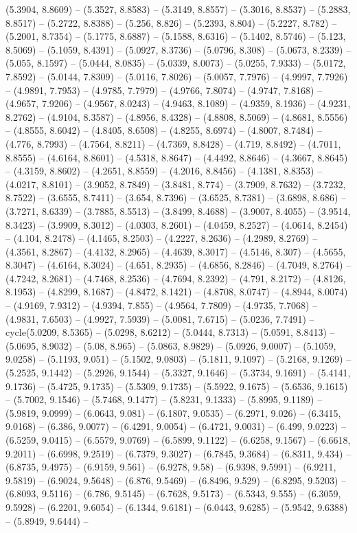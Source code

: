 (5.3904, 8.8609) -- (5.3527, 8.8583) -- (5.3149, 8.8557) -- (5.3016, 8.8537) -- (5.2883, 8.8517) -- (5.2722, 8.8388) -- (5.256, 8.826) -- (5.2393, 8.804) -- (5.2227, 8.782) -- (5.2001, 8.7354) -- (5.1775, 8.6887) -- (5.1588, 8.6316) -- (5.1402, 8.5746) -- (5.123, 8.5069) -- (5.1059, 8.4391) -- (5.0927, 8.3736) -- (5.0796, 8.308) -- (5.0673, 8.2339) -- (5.055, 8.1597) -- (5.0444, 8.0835) -- (5.0339, 8.0073) -- (5.0255, 7.9333) -- (5.0172, 7.8592) -- (5.0144, 7.8309) -- (5.0116, 7.8026) -- (5.0057, 7.7976) -- (4.9997, 7.7926) -- (4.9891, 7.7953) -- (4.9785, 7.7979) -- (4.9766, 7.8074) -- (4.9747, 7.8168) -- (4.9657, 7.9206) -- (4.9567, 8.0243) -- (4.9463, 8.1089) -- (4.9359, 8.1936) -- (4.9231, 8.2762) -- (4.9104, 8.3587) -- (4.8956, 8.4328) -- (4.8808, 8.5069) -- (4.8681, 8.5556) -- (4.8555, 8.6042) -- (4.8405, 8.6508) -- (4.8255, 8.6974) -- (4.8007, 8.7484) -- (4.776, 8.7993) -- (4.7564, 8.8211) -- (4.7369, 8.8428) -- (4.719, 8.8492) -- (4.7011, 8.8555) -- (4.6164, 8.8601) -- (4.5318, 8.8647) -- (4.4492, 8.8646) -- (4.3667, 8.8645) -- (4.3159, 8.8602) -- (4.2651, 8.8559) -- (4.2016, 8.8456) -- (4.1381, 8.8353) -- (4.0217, 8.8101) -- (3.9052, 8.7849) -- (3.8481, 8.774) -- (3.7909, 8.7632) -- (3.7232, 8.7522) -- (3.6555, 8.7411) -- (3.654, 8.7396) -- (3.6525, 8.7381) -- (3.6898, 8.686) -- (3.7271, 8.6339) -- (3.7885, 8.5513) -- (3.8499, 8.4688) -- (3.9007, 8.4055) -- (3.9514, 8.3423) -- (3.9909, 8.3012) -- (4.0303, 8.2601) -- (4.0459, 8.2527) -- (4.0614, 8.2454) -- (4.104, 8.2478) -- (4.1465, 8.2503) -- (4.2227, 8.2636) -- (4.2989, 8.2769) -- (4.3561, 8.2867) -- (4.4132, 8.2965) -- (4.4639, 8.3017) -- (4.5146, 8.307) -- (4.5655, 8.3047) -- (4.6164, 8.3024) -- (4.651, 8.2935) -- (4.6856, 8.2846) -- (4.7049, 8.2764) -- (4.7242, 8.2681) -- (4.7468, 8.2536) -- (4.7694, 8.2392) -- (4.791, 8.2172) -- (4.8126, 8.1953) -- (4.8299, 8.1687) -- (4.8472, 8.1421) -- (4.8708, 8.0747) -- (4.8944, 8.0074) -- (4.9169, 7.9312) -- (4.9394, 7.855) -- (4.9564, 7.7809) -- (4.9735, 7.7068) -- (4.9831, 7.6503) -- (4.9927, 7.5939) -- (5.0081, 7.6715) -- (5.0236, 7.7491) -- cycle(5.0209, 8.5365) -- (5.0298, 8.6212) -- (5.0444, 8.7313) -- (5.0591, 8.8413) -- (5.0695, 8.9032) -- (5.08, 8.965) -- (5.0863, 8.9829) -- (5.0926, 9.0007) -- (5.1059, 9.0258) -- (5.1193, 9.051) -- (5.1502, 9.0803) -- (5.1811, 9.1097) -- (5.2168, 9.1269) -- (5.2525, 9.1442) -- (5.2926, 9.1544) -- (5.3327, 9.1646) -- (5.3734, 9.1691) -- (5.4141, 9.1736) -- (5.4725, 9.1735) -- (5.5309, 9.1735) -- (5.5922, 9.1675) -- (5.6536, 9.1615) -- (5.7002, 9.1546) -- (5.7468, 9.1477) -- (5.8231, 9.1333) -- (5.8995, 9.1189) -- (5.9819, 9.0999) -- (6.0643, 9.081) -- (6.1807, 9.0535) -- (6.2971, 9.026) -- (6.3415, 9.0168) -- (6.386, 9.0077) -- (6.4291, 9.0054) -- (6.4721, 9.0031) -- (6.499, 9.0223) -- (6.5259, 9.0415) -- (6.5579, 9.0769) -- (6.5899, 9.1122) -- (6.6258, 9.1567) -- (6.6618, 9.2011) -- (6.6998, 9.2519) -- (6.7379, 9.3027) -- (6.7845, 9.3684) -- (6.8311, 9.434) -- (6.8735, 9.4975) -- (6.9159, 9.561) -- (6.9278, 9.58) -- (6.9398, 9.5991) -- (6.9211, 9.5819) -- (6.9024, 9.5648) -- (6.876, 9.5469) -- (6.8496, 9.529) -- (6.8295, 9.5203) -- (6.8093, 9.5116) -- (6.786, 9.5145) -- (6.7628, 9.5173) -- (6.5343, 9.555) -- (6.3059, 9.5928) -- (6.2201, 9.6054) -- (6.1344, 9.6181) -- (6.0443, 9.6285) -- (5.9542, 9.6388) -- (5.8949, 9.6444) -- 